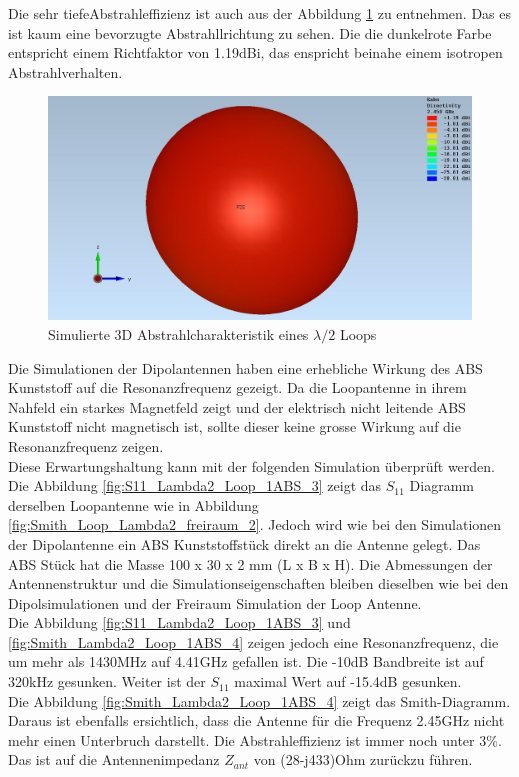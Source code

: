 Die sehr tiefeAbstrahleffizienz ist auch aus der Abbildung \ref{fig:sim_Loop_freiraum_3D} zu entnehmen. Das es ist kaum eine bevorzugte Abstrahllrichtung zu sehen. Die die dunkelrote Farbe entspricht einem Richtfaktor von 1.19dBi, das enspricht beinahe einem isotropen Abstrahlverhalten.
\begin{figure}[h]
	\centering
	\includegraphics[width=13cm]{content/bilder/Evaluation/Loop/L2/ohneABS/EM_Far_Field_Loop_Lambda2_ohneABS.JPG}%
	\caption{Simulierte 3D Abstrahlcharakteristik eines $\lambda/2$ Loops}
	\label{fig:sim_Loop_freiraum_3D}
\end{figure}
\newpage
Die Simulationen der Dipolantennen haben eine erhebliche Wirkung des ABS Kunststoff auf die Resonanzfrequenz gezeigt. Da die Loopantenne in ihrem Nahfeld ein starkes Magnetfeld zeigt und der elektrisch nicht leitende ABS Kunststoff  nicht magnetisch ist, sollte dieser keine grosse Wirkung auf die Resonanzfrequenz zeigen.\\ Diese Erwartungshaltung kann mit der folgenden Simulation überprüft werden.\\
 
Die Abbildung \ref{fig:S11_Lambda2_Loop_1ABS_3} zeigt das $S_{11}$ Diagramm derselben Loopantenne wie in Abbildung \ref{fig:Smith_Loop_Lambda2_freiraum_2}. Jedoch wird wie bei den Simulationen der Dipolantenne ein ABS Kunststoffstück direkt an die Antenne gelegt. Das ABS Stück hat die Masse 100 x 30 x 2 mm (L x B x H). Die Abmessungen der Antennenstruktur und die Simulationseigenschaften bleiben  dieselben wie bei den Dipolsimulationen und der Freiraum Simulation der Loop Antenne.\\

Die Abbildung \ref{fig:S11_Lambda2_Loop_1ABS_3} und \ref{fig:Smith_Lambda2_Loop_1ABS_4} zeigen jedoch eine Resonanzfrequenz, die um mehr als 1430MHz auf 4.41GHz gefallen ist. Die -10dB Bandbreite ist auf 320kHz gesunken. Weiter ist der $S_{11}$ maximal Wert auf -15.4dB gesunken.\\
Die Abbildung \ref{fig:Smith_Lambda2_Loop_1ABS_4} zeigt das Smith-Diagramm. Daraus ist ebenfalls ersichtlich, dass die Antenne für die Frequenz 2.45GHz nicht mehr einen Unterbruch darstellt. Die Abstrahleffizienz ist immer noch unter $3\%$. Das ist auf die Antennenimpedanz $Z_{ant}$ von (28-j433)Ohm zurückzu führen.

